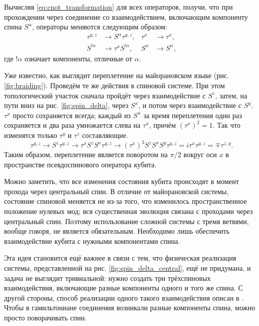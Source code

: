 \documentclass[a4paper,12pt]{article}
\theoremstyle{plain} %
\theoremstyle{definition} %
\theoremstyle{remark} %
\begin{document}
Вычисляя \ref{eq:cnot_transformation} для всех операторов, получи, что при прохождении через соединение со взаимодействием, включающим компоненту спина $S^\alpha$, операторы меняются следующим образом:
\begin{align}
    \tau^{y,z} &\rightarrow S^\alpha \tau^{y,z}, & \tau^x &\rightarrow \tau^x, \\
    S^{!\alpha} &\rightarrow \tau^x S^{!\alpha}, & S^\alpha &\rightarrow S^\alpha,
    \label{eq:spin_transformation}
\end{align}
где $!\alpha$ означает компоненты, отличные от $\alpha$.

Уже известно, как выглядит переплетение на майорановском языке (рис. \ref{fig:braiding}). Проведём те же действия в спиновой системе. При этом топологический участок сначала пройдёт через взаимодействие с $S^z$, затем, на пути вниз на рис. \ref{fig:spin_delta}, через $S^x$, и потом через взаимодействие с $S^y$. $\tau^x$ просто сохраняется всегда; каждый из $S^\alpha$ за время переплетения один раз сохраняется и два раза умножается слева на $\tau^x$, причём $\left( \tau^x \right)^2 = 1$. Так что изменятся только $\tau^y$ и $\tau^z$ составляющие.
\begin{equation}
    \tau^{y,z} \rightarrow S^z \tau^{y,z} \rightarrow \tau^x S^z S^x \tau^{y,z} \rightarrow \left( \tau^x \right)^3 S^z S^x S^y \tau^{y,z} = i \tau^x \tau^{y,z} = \mp \tau^{z,y}.
\end{equation}
Таким образом, переплетение является поворотом на $\pi/2$ вокруг оси $x$ в пространстве псевдоспинового оператора кубита.

Можно заметить, что все изменения состояния кубита происходят в момент прохода через центральный спин. В отличие от майорановской системы, состояние спиновой меняется не из-за того, что изменилось пространственное положение нулевых мод; вся существенная эволюция связана с проходами через центральный спин. Поэтому использование сложной системы с тремя ветвями, вообще говоря, не является обязательным. Необходимо лишь обеспечить взаимодействие кубита с нужными компонентами спина.

Эта идея становится ещё важнее в связи с тем, что физическая реализация системы, представленной на рис. \ref{fig:spin_delta_central}, ещё не придумана, и задача не выглядит тривиальной: нужно создать три трёхспиновых взаимодействия, включающие разные компоненты одного и того же спина. С другой стороны, способ реализации одного такого взаимодействия описан в \cite{main}. Чтобы в гамильтониане соединения возникали разные компоненты спина, можно просто поворачивать спин.
\end{document}
